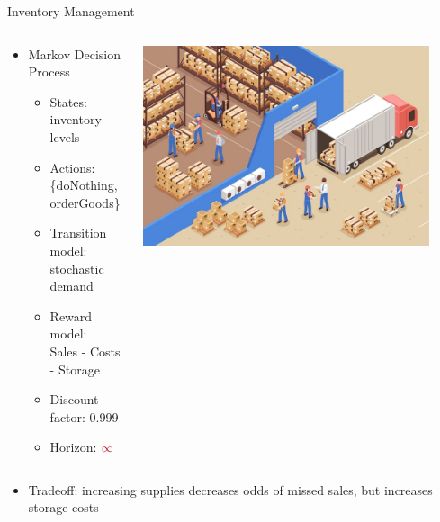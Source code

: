 \documentclass[11pt,table]{beamer}
\begin{document}
\begin{frame}{Inventory Management}

\begin{columns}[T]
\begin{column}{0.6\textwidth}
\begin{itemize}
   \item Markov Decision Process
   \begin{itemize}
\item States: \textcolor{red1}{inventory levels}
\item Actions: \textcolor{red1}{\{doNothing, orderGoods\}}
\item Transition model: \textcolor{red1}{stochastic demand}
\item Reward model:\\ \textcolor{red1}{Sales - Costs - Storage}
\item Discount factor: \textcolor{red1}{0.999}
\item Horizon: $\textcolor{red1}{\infty}$
\end{itemize}
\end{itemize}
\end{column}
\begin{column}{0.4\textwidth}
\centering
\includegraphics[width=0.9\textwidth]{figures/4.png}
\end{column}
\end{columns}
\vspace{5mm}
\begin{itemize}
    \item Tradeoff: \textcolor{red1}{increasing supplies decreases odds of  missed sales, but increases storage costs}
 \end{itemize}

\end{frame}
\end{document}
